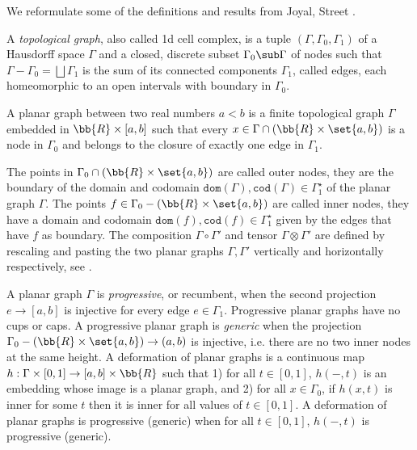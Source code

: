 
We reformulate some of the definitions and results from Joyal, Street \cite{JoyalStreet88}.

\begin{definition}
A \emph{topological graph}, also called 1d cell complex, is a tuple $(\Gamma, \Gamma_0, \Gamma_1)$ of a Hausdorff space $\Gamma$ and a closed, discrete subset $\Gamma_0 \sub \Gamma$ of nodes such that $\Gamma - \Gamma_0 = \bigsqcup \Gamma_1$ is the sum of its connected components $\Gamma_1$, called edges, each homeomorphic to an open intervals with boundary in $\Gamma_0$.
\end{definition}

\begin{definition}
A planar graph between two real numbers $a < b$ is a finite topological graph $\Gamma$ embedded in $\bb{R} \times [a, b]$ such that every $x \in \Gamma \cap (\bb{R} \times \set{a, b})$ is a node in $\Gamma_0$ and belongs to the closure of exactly one edge in $\Gamma_1$.
\end{definition}

The points in $\Gamma_0 \cap (\bb{R} \times \set{a, b})$ are called outer nodes,
they are the boundary of the domain and codomain $\mathtt{dom}(\Gamma), \mathtt{cod}(\Gamma) \in \Gamma_1^\star$ of the planar graph $\Gamma$.
The points $f \in \Gamma_0 - (\bb{R} \times \set{a, b})$ are called inner nodes, they have a domain and codomain $\mathtt{dom}(f), \mathtt{cod}(f) \in \Gamma_1^\star$ given by the edges that have $f$ as boundary.
The composition $\Gamma \circ \Gamma'$ and tensor $\Gamma \otimes \Gamma'$ are defined by rescaling and pasting the two planar graphs $\Gamma, \Gamma'$ vertically and horizontally respectively, see \cite[§4]{JoyalStreet88}.

A planar graph $\Gamma$ is \emph{progressive}, or recumbent, when the second projection $e \to [a, b]$ is injective for every edge $e \in \Gamma_1$. Progressive planar graphs have no cups or caps.
A progressive planar graph is \emph{generic} when the projection $\Gamma_0 - (\bb{R} \times \set{a, b}) \to (a, b)$ is injective, i.e. there are no two inner nodes at the same height.
A deformation of planar graphs is a continuous map $h : \Gamma \times [0, 1] \to [a, b] \times \bb{R}$ such that 1) for all $t \in [0, 1]$, $h(-, t)$ is an embedding whose image is a planar graph, and 2) for all $x \in \Gamma_0$, if $h(x, t)$ is inner for some $t$ then it is inner for all values of $t \in [0, 1]$.
A deformation of planar graphs is progressive (generic) when for all $t \in [0, 1]$, $h(-, t)$ is progressive (generic).

